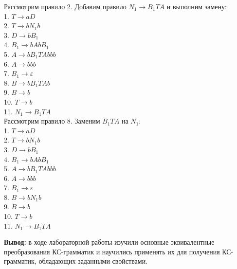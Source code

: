 \documentclass[a4paper,14pt]{extarticle}
\begin{document}
\begin{enumerate}[1.]
Рассмотрим правило 2. Добавим правило $N_1 \rightarrow B_1TA$ и выполним замену:\\
1. $T \rightarrow aD$\\
2. $T \rightarrow bN_1b$\\
3. $D \rightarrow bB_1$\\
4. $B_1 \rightarrow bAbB_1$\\
5. $A \rightarrow bB_1TAbbb$\\
6. $A \rightarrow bbb$\\
7. $B_1 \rightarrow \varepsilon$\\
8. $B \rightarrow bB_1TAb$\\
9. $B \rightarrow b$\\
10. $T \rightarrow b$\\
11. $N_1 \rightarrow B_1TA$\\

Рассмотрим правило 8. Заменим $B_1TA$ на $N_1$:\\
1. $T \rightarrow aD$\\
2. $T \rightarrow bN_1b$\\
3. $D \rightarrow bB_1$\\
4. $B_1 \rightarrow bAbB_1$\\
5. $A \rightarrow bB_1TAbbb$\\
6. $A \rightarrow bbb$\\
7. $B_1 \rightarrow \varepsilon$\\
8. $B \rightarrow bN_1b$\\
9. $B \rightarrow b$\\
10. $T \rightarrow b$\\
11. $N_1 \rightarrow B_1TA$\\



\end{enumerate}

\textbf{Вывод: } в ходе лабораторной работы изучили основные эквивалентные преобразования
КС-грамматик и научились применять их для получения
КС-грамматик, обладающих заданными свойствами.
\end{document}
